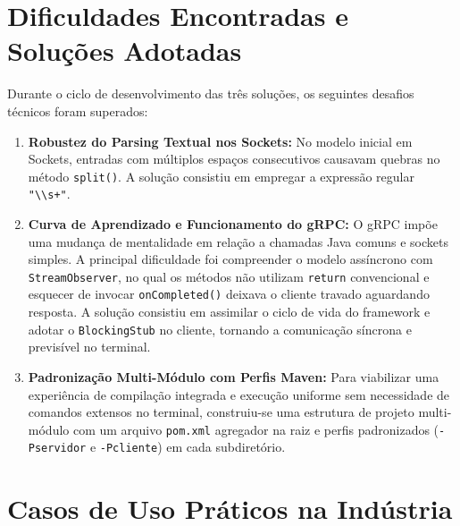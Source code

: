 \documentclass[12pt, a4paper]{article}
\begin{document}
\section{Dificuldades Encontradas e Soluções Adotadas}

Durante o ciclo de desenvolvimento das três soluções, os seguintes desafios técnicos foram superados:

\begin{enumerate}
    \item \textbf{Robustez do Parsing Textual nos Sockets:}
    No modelo inicial em Sockets, entradas com múltiplos espaços consecutivos causavam quebras no método \texttt{split()}. A solução consistiu em empregar a expressão regular \texttt{"\textbackslash\textbackslash s+"}.

    \item \textbf{Curva de Aprendizado e Funcionamento do gRPC:}
    O gRPC impõe uma mudança de mentalidade em relação a chamadas Java comuns e sockets simples. A principal dificuldade foi compreender o modelo assíncrono com \texttt{StreamObserver}, no qual os métodos não utilizam \texttt{return} convencional e esquecer de invocar \texttt{onCompleted()} deixava o cliente travado aguardando resposta. A solução consistiu em assimilar o ciclo de vida do framework e adotar o \texttt{BlockingStub} no cliente, tornando a comunicação síncrona e previsível no terminal.

    \item \textbf{Padronização Multi-Módulo com Perfis Maven:}
    Para viabilizar uma experiência de compilação integrada e execução uniforme sem necessidade de comandos extensos no terminal, construiu-se uma estrutura de projeto multi-módulo com um arquivo \texttt{pom.xml} agregador na raiz e perfis padronizados (\texttt{-Pservidor} e \texttt{-Pcliente}) em cada subdiretório.
\end{enumerate}

\section{Casos de Uso Práticos na Indústria}
\end{document}
